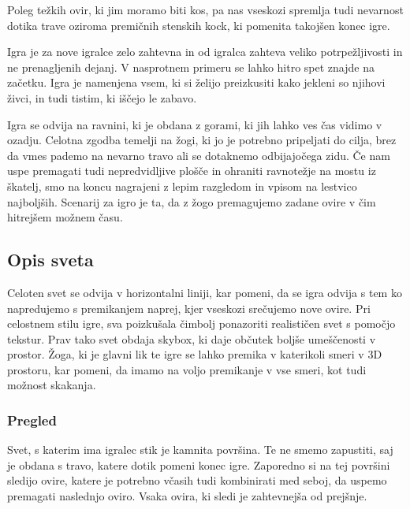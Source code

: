 \documentclass[a4paper]{article}
\begin{document}
Poleg težkih ovir, ki jim moramo biti kos, pa nas vseskozi spremlja tudi nevarnost dotika trave oziroma premičnih stenskih kock, ki pomenita takojšen konec igre. 

Igra je za nove igralce zelo zahtevna in od igralca zahteva veliko potrpežljivosti in ne prenagljenih dejanj. V nasprotnem primeru se lahko hitro spet znajde na začetku. Igra je namenjena vsem, ki si želijo preizkusiti kako jekleni so njihovi živci, in tudi tistim, ki iščejo le zabavo. 

Igra se odvija na ravnini, ki je obdana z gorami, ki jih lahko ves čas vidimo v ozadju. Celotna zgodba temelji na žogi, ki jo je potrebno pripeljati do cilja, brez da vmes pademo na nevarno travo ali se dotaknemo odbijajočega zidu. Če nam uspe premagati tudi nepredvidljive plošče in ohraniti ravnotežje na mostu iz škatelj, smo na koncu nagrajeni z lepim razgledom in vpisom na lestvico najboljših.  Scenarij za igro je ta, da z žogo premagujemo zadane ovire v čim hitrejšem možnem času.


\subsection{Opis sveta}
Celoten svet se odvija v horizontalni liniji, kar pomeni, da se igra odvija s tem ko napredujemo s premikanjem naprej, kjer vseskozi srečujemo nove ovire. Pri celostnem stilu igre, sva poizkušala čimbolj ponazoriti realističen svet s pomočjo tekstur. Prav tako svet obdaja skybox, ki daje občutek boljše umeščenosti v prostor. Žoga, ki je glavni lik te igre se lahko premika v katerikoli smeri v 3D prostoru, kar pomeni, da imamo na voljo premikanje v vse smeri, kot tudi možnost skakanja.

\subsubsection{Pregled}
Svet, s katerim ima igralec stik je kamnita površina. Te ne smemo zapustiti, saj je obdana s travo, katere dotik pomeni konec igre. Zaporedno si na tej površini sledijo ovire, katere je potrebno včasih tudi kombinirati med seboj, da uspemo premagati naslednjo oviro. Vsaka ovira, ki sledi je zahtevnejša od prejšnje.
\end{document}
